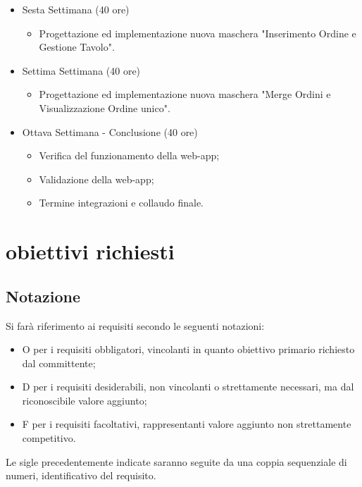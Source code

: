 \begin{itemize}
\begin{itemize}
        \end{itemize}
    \item Sesta Settimana (40 ore)
    \begin{itemize}
        \item Progettazione ed implementazione nuova maschera "Inserimento Ordine e Gestione Tavolo".
    \end{itemize}
    \item Settima Settimana (40 ore)
    \begin{itemize}
        \item Progettazione ed implementazione nuova maschera "Merge Ordini e Visualizzazione Ordine unico".
    \end{itemize}
    \item Ottava Settimana - Conclusione (40 ore)
    \begin{itemize}
        \item Verifica del funzionamento della web-app;
        \item Validazione della web-app;
        \item Termine integrazioni e collaudo finale.
    \end{itemize}
\end{itemize}

\section{obiettivi richiesti}
\subsection{Notazione}
Si farà riferimento ai requisiti secondo le seguenti notazioni:
\begin{itemize}
    \item O per i requisiti obbligatori, vincolanti in quanto obiettivo primario richiesto dal committente;
    \item D per i requisiti desiderabili, non vincolanti o strettamente necessari, ma dal riconoscibile valore
    aggiunto;
    \item F per i requisiti facoltativi, rappresentanti valore aggiunto non strettamente competitivo.
\end{itemize}
Le sigle precedentemente indicate saranno seguite da una coppia sequenziale di numeri, identificativo del
requisito.
